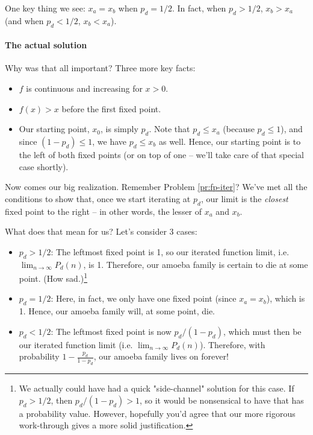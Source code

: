 One key thing we see: $x_a = x_b$ when $p_d = 1/2$. In fact, when $p_d > 1/2$, $x_b > x_a$ (and when $p_d < 1/2$, $x_b < x_a$). 




\paragraph{The actual solution}

Why was that all important? Three more key facts:

\begin{itemize}
\item $f$ is continuous and increasing for $x > 0$. 
\item $f(x) > x$ before the first fixed point. 
\item Our starting point, $x_0$, is simply $p_d$. Note that $p_d \leq x_a$ (because $p_d \leq 1$), and since $(1 - p_d) \leq 1$, we have $p_d \leq x_b$ as well. Hence, our starting point is to the left of both fixed points (or on top of one -- we'll take care of that special case shortly). 
\end{itemize}

Now comes our big realization. Remember Problem \ref{pr:fp-iter}? We've met all the conditions to show that, once we start iterating at $p_d$, our limit is the \emph{closest} fixed point to the right -- in other words, the lesser of $x_a$ and $x_b$.

What does that mean for us? Let's consider 3 cases:

\begin{itemize}
\item $p_d > 1/2$: The leftmost fixed point is 1, so our iterated function limit, i.e. $\lim_{n \rightarrow \infty} P_d(n)$, is 1. Therefore, our amoeba family is certain to die at some point. (How sad.)\footnote{We actually could have had a quick "side-channel" solution for this case. If $p_d > 1/2$, then $p_d / (1 - p_d) > 1$, so it would be nonsensical to have that has a probability value. However, hopefully you'd agree that our more rigorous work-through gives a more solid justification.}
\item $p_d = 1/2$: Here, in fact, we only have one fixed point (since $x_a = x_b$), which is 1. Hence, our amoeba family will, at some point, die.
\item $p_d < 1/2$: The leftmost fixed point is now $p_d / (1 - p_d)$, which must then be our iterated function limit (i.e. $\lim_{n \rightarrow \infty} P_d(n)$). Therefore, with probability $1 - \frac{p_d}{1-p_d}$, our amoeba family lives on forever!
\end{itemize}


